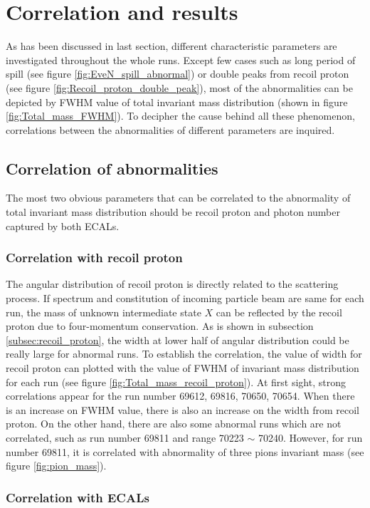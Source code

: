 
\section{Correlation and results}
As has been discussed in last section, different characteristic parameters are investigated throughout the whole runs. Except few cases such as long period of spill (see figure \ref{fig:EveN_spill_abnormal}) or double peaks from recoil proton (see figure \ref{fig:Recoil_proton_double_peak}), most of the abnormalities can be depicted by FWHM value of total invariant mass distribution (shown in figure \ref{fig:Total_mass_FWHM}). To decipher the cause behind all these phenomenon, correlations between the abnormalities of different parameters are inquired.

\subsection{Correlation of abnormalities}
The most two obvious parameters that can be correlated to the abnormality of total invariant mass distribution should be recoil proton and photon number captured by both ECALs.
\subsubsection{Correlation with recoil proton}
The angular distribution of recoil proton is directly related to the scattering process. If spectrum and constitution of incoming particle beam are same for each run, the mass of unknown intermediate state $X$ can be reflected by the recoil proton due to four-momentum conservation. As is shown in subsection \ref{subsec:recoil_proton}, the width at lower half of angular distribution could be really large for abnormal runs. To establish the correlation, the value of width for recoil proton can plotted with the value of FWHM of invariant mass distribution for each run (see figure \ref{fig:Total_mass_recoil_proton}). At first sight, strong correlations appear for the run number 69612, 69816, 70650, 70654. When there is an increase on FWHM value, there is also an increase on the width from recoil proton. On the other hand, there are also some abnormal runs which are not correlated, such as run number 69811 and range 70223 $\sim$ 70240. However, for run number 69811, it is correlated with abnormality of three pions invariant mass (see figure \ref{fig:pion_mass}).


\subsubsection{Correlation with ECALs}

